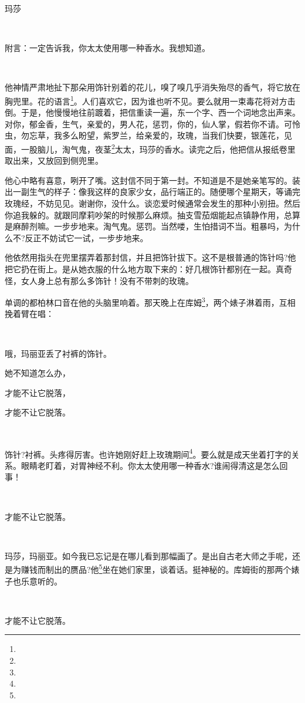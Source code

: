 \par 玛莎
\par  
\par 附言：一定告诉我，你太太使用哪一种香水。我想知道。
\par  
\par 他神情严肃地扯下那朵用饰针别着的花儿，嗅了嗅几乎消失殆尽的香气，将它放在胸兜里。花的语言\footnote{}。人们喜欢它，因为谁也听不见。要么就用一束毒花将对方击倒。于是，他慢慢地往前踱着，把信重读一遍，东一个字、西一个词地念出声来。对你，郁金香，生气，亲爱的，男人花，惩罚，你的，仙人掌，假若你不请。可怜虫，勿忘草，我多么盼望，紫罗兰，给亲爱的，玫瑰，当我们快要，银莲花，见面，一股脑儿，淘气鬼，夜茎\footnote{}太太，玛莎的香水。读完之后，他把信从报纸卷里取出来，又放回到侧兜里。
\par 他心中略有喜意，咧开了嘴。这封信不同于第一封。不知道是不是她亲笔写的。装出一副生气的样子：像我这样的良家少女，品行端正的。随便哪个星期天，等诵完玫瑰经，不妨见见。谢谢你，没什么。谈恋爱时候通常会发生的那种小别扭。然后你追我躲的。就跟同摩莉吵架的时候那么麻烦。抽支雪茄烟能起点镇静作用，总算是麻醉剂嘛。一步步地来。淘气鬼。惩罚。当然喽，生怕措词不当。粗暴吗，为什么不?反正不妨试它一试，一步步地来。
\par 他依然用指头在兜里摆弄着那封信，并且把饰针拔下。这不是根普通的饰针吗?他把它扔在街上。是从她衣服的什么地方取下来的：好几根饰针都别在一起。真奇怪，女人身上总有那么多饰针！没有不带刺的玫瑰。
\par 单调的都柏林口音在他的头脑里响着。那天晚上在库姆\footnote{}，两个婊子淋着雨，互相挽着臂在唱：
\par  
\par 哦，玛丽亚丢了衬裤的饰针。
\par 她不知道怎么办，
\par 才能不让它脱落，
\par 才能不让它脱落。
\par  
\par 饰针?衬裤。头疼得厉害。也许她刚好赶上玫瑰期间\footnote{}。要么就是成天坐着打字的关系。眼睛老盯着，对胃神经不利。你太太使用哪一种香水?谁闹得清这是怎么回事！
\par  
\par 才能不让它脱落。
\par  
\par 玛莎，玛丽亚。如今我已忘记是在哪儿看到那幅画了。是出自古老大师之手呢，还是为赚钱而制出的赝品?他\footnote{}坐在她们家里，谈着话。挺神秘的。库姆街的那两个婊子也乐意听的。
\par  
\par 才能不让它脱落。
